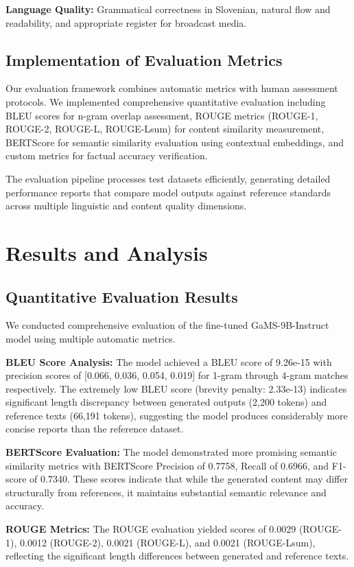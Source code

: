\documentclass[fleqn,moreauthors,10pt]{ds_report}
\begin{document}
\textbf{Language Quality:} Grammatical correctness in Slovenian, natural flow and readability, and appropriate register for broadcast media.

\subsection*{Implementation of Evaluation Metrics}
Our evaluation framework combines automatic metrics with human assessment protocols. We implemented comprehensive quantitative evaluation including BLEU scores for n-gram overlap assessment, ROUGE metrics (ROUGE-1, ROUGE-2, ROUGE-L, ROUGE-Lsum) for content similarity measurement, BERTScore for semantic similarity evaluation using contextual embeddings, and custom metrics for factual accuracy verification.

The evaluation pipeline processes test datasets efficiently, generating detailed performance reports that compare model outputs against reference standards across multiple linguistic and content quality dimensions.

\section*{Results and Analysis}

\subsection*{Quantitative Evaluation Results}
We conducted comprehensive evaluation of the fine-tuned GaMS-9B-Instruct model using multiple automatic metrics. 

\textbf{BLEU Score Analysis:} The model achieved a BLEU score of 9.26e-15 with precision scores of [0.066, 0.036, 0.054, 0.019] for 1-gram through 4-gram matches respectively. The extremely low BLEU score (brevity penalty: 2.33e-13) indicates significant length discrepancy between generated outputs (2,200 tokens) and reference texts (66,191 tokens), suggesting the model produces considerably more concise reports than the reference dataset.

\textbf{BERTScore Evaluation:} The model demonstrated more promising semantic similarity metrics with BERTScore Precision of 0.7758, Recall of 0.6966, and F1-score of 0.7340. These scores indicate that while the generated content may differ structurally from references, it maintains substantial semantic relevance and accuracy.

\textbf{ROUGE Metrics:} The ROUGE evaluation yielded scores of 0.0029 (ROUGE-1), 0.0012 (ROUGE-2), 0.0021 (ROUGE-L), and 0.0021 (ROUGE-Lsum), reflecting the significant length differences between generated and reference texts.
\end{document}
